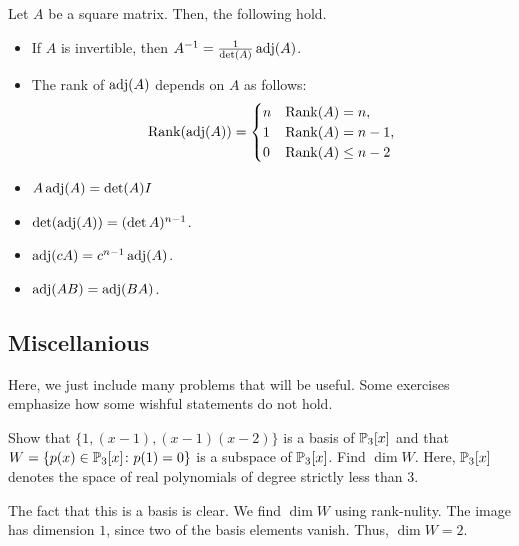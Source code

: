 \begin{theorem}
Let $A$ be a square matrix. Then, the following hold.
\begin{itemize}
\item If $A$ is invertible, then $A^{-1} = \frac{1}{\det (A)} \adj(A)$.
\item The rank of $\adj(A)$ depends on $A$ as follows:
\[
\rank(\adj(A)) = \begin{cases}
n & \rank(A) = n, \\
1 & \rank(A) = n - 1, \\
0 & \rank(A) \leq n - 2
\end{cases}
\]
\item $A \adj(A) = \det(A) I$
\item $\det(\adj(A)) = (\det A)^{n - 1}$.
\item $\adj(cA) = c^{n - 1} \adj(A)$.
\item $\adj(AB) = \adj(BA)$.
\end{itemize}
\end{theorem}

\subsection{Miscellanious}

Here, we just include many problems that will be useful. Some exercises
emphasize how some wishful statements do not hold.

\begin{exercise}
    Show that $\{1, (x-1), (x-1)(x-2)\}$ is a basis of $\P_3[x]$ and that
    $W = \{p(x) \in \P_3[x] \colon p(1) = 0\}$ is a subspace of $\P_3[x]$. Find $\dim W$.
    Here, $\P_3[x]$ denotes the space of real polynomials of degree strictly less than $3$.
\end{exercise}
\begin{solution}
    The fact that this is a basis is clear. We find $\dim W$ using rank-nulity.
    The image has dimension $1$, since two of the basis elements vanish. 
    Thus, $\dim W=2$.
\end{solution}


